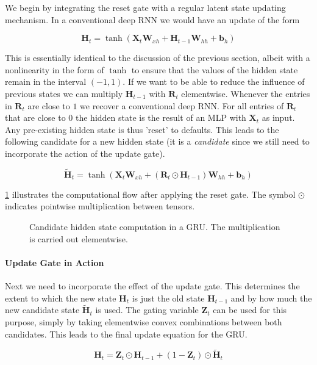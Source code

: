 We begin by integrating the reset gate with a regular latent state updating mechanism. In a conventional deep RNN we would have an update of the form

$$\mathbf{H}_t = \tanh(\mathbf{X}_t \mathbf{W}_{xh} + \mathbf{H}_{t-1}\mathbf{W}_{hh} + \mathbf{b}_h)$$

This is essentially identical to the discussion of the previous section, albeit with a nonlinearity in the form of $\tanh$ to ensure that the values of the hidden state remain in the interval $(-1, 1)$.
If we want to be able to reduce the influence of previous states we can multiply $\mathbf{H}_{t-1}$ with $\mathbf{R}_t$ elementwise. Whenever the entries in $\mathbf{R}_t$ are close to $1$ we recover a conventional deep RNN. For all entries of $\mathbf{R}_t$ that are close to $0$ the hidden state is the result of an MLP with $\mathbf{X}_t$ as input. Any pre-existing hidden state is thus 'reset' to defaults. This leads to the following candidate for a new hidden state (it is a \textit{candidate} since we still need to incorporate the action of the update gate).

$$\tilde{\mathbf{H}}_t = \tanh(\mathbf{X}_t \mathbf{W}_{xh} + \left(\mathbf{R}_t \odot \mathbf{H}_{t-1}\right) \mathbf{W}_{hh} + \mathbf{b}_h)$$

\cref{fig:gru_2} illustrates the computational flow after applying the reset gate. The symbol $\odot$ indicates pointwise multiplication between tensors.

\begin{figure}[hpt]
	\centering
	
	\caption{Candidate hidden state computation in a GRU. The multiplication is carried out elementwise.}
	\label{fig:gru_2}
\end{figure}

\paragraph{Update Gate in Action}

Next we need to incorporate the effect of the update gate. This determines the extent to which the new state $\mathbf{H}_t$ is just the old state $\mathbf{H}_{t-1}$ and by how much the new candidate state $\tilde{\mathbf{H}}_t$ is used. The gating variable $\mathbf{Z}_t$ can be used for this purpose, simply by taking elementwise convex combinations between both candidates. This leads to the final update equation for the GRU.

$$\mathbf{H}_t = \mathbf{Z}_t \odot \mathbf{H}_{t-1}  + (1 - \mathbf{Z}_t) \odot \tilde{\mathbf{H}}_t$$

